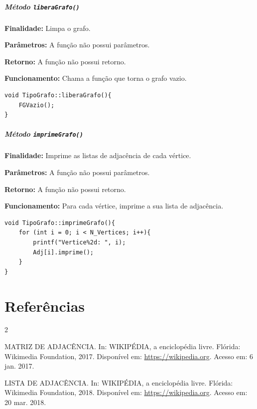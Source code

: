 \documentclass{article}
\begin{document}
\subparagraph{Método \texttt{liberaGrafo()}}

    \mbox{}\par
    \noindent
    \textbf{Finalidade:} Limpa o grafo.

    \textbf{Parâmetros:} A função não possui parâmetros.

    \textbf{Retorno:} A função não possui retorno.

    \textbf{Funcionamento:} Chama a função que torna o grafo vazio.

\begin{verbatim}
void TipoGrafo::liberaGrafo(){
    FGVazio();
}
\end{verbatim}

\subparagraph{Método \texttt{imprimeGrafo()}}

    \mbox{}\par
    \noindent
    \textbf{Finalidade:} Imprime as listas de adjacência de cada vértice.

    \textbf{Parâmetros:} A função não possui parâmetros.

    \textbf{Retorno:} A função não possui retorno.

    \textbf{Funcionamento:} Para cada vértice, imprime a sua lista de adjacência.

\begin{verbatim}
void TipoGrafo::imprimeGrafo(){
    for (int i = 0; i < N_Vertices; i++){
        printf("Vertice%2d: ", i);
        Adj[i].imprime();
    }
}
\end{verbatim}

\section*{Referências}

\begin{thebibliography}{2}

MATRIZ DE ADJACÊNCIA. In: WIKIPÉDIA, a enciclopédia livre. Flórida: Wikimedia Foundation, 2017. 
Disponível em: \url{https://wikipedia.org}. Acesso em: 6 jan. 2017.

LISTA DE ADJACÊNCIA. In: WIKIPÉDIA, a enciclopédia livre. Flórida: Wikimedia Foundation, 2018. 
Disponível em: \url{https://wikipedia.org}. Acesso em: 20 mar. 2018.

\end{thebibliography}
\end{document}
